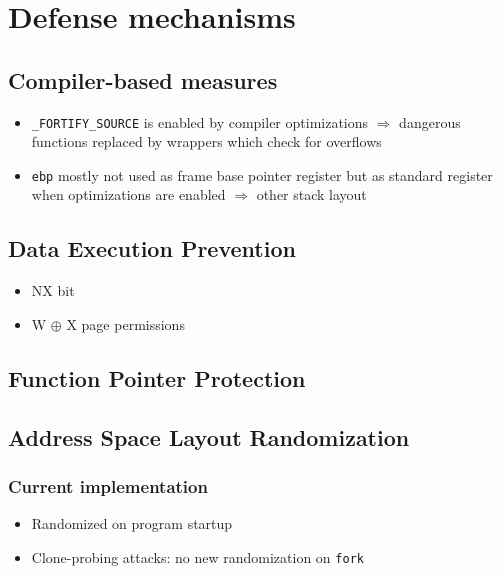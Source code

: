 \chapter{Defense mechanisms}
\label{chp:defense-mechanisms}

\section{Compiler-based measures}
\label{sec:compiler-based-measures}

\begin{itemize}
	\item{
		\texttt{\_FORTIFY\_SOURCE} is enabled by compiler optimizations $\Rightarrow$ dangerous functions replaced by wrappers which check for overflows
	}
	\item{
		\texttt{ebp} mostly not used as frame base pointer register but as standard register when optimizations are enabled $\Rightarrow$ other stack layout
	}
\end{itemize}

\section{Data Execution Prevention}
\label{sec:dep}

\begin{itemize}
	\item{NX bit}
	\item{W $ \oplus $ X page permissions}
\end{itemize}

\section{Function Pointer Protection}
\label{sec:fpp}

\section{Address Space Layout Randomization}
\label{sec:aslr}

\subsection{Current implementation}
\label{subsec:aslr-current}

\begin{itemize}
	\item{Randomized on program startup}
	\item{Clone-probing attacks: no new randomization on \texttt{fork}}
\end{itemize}

